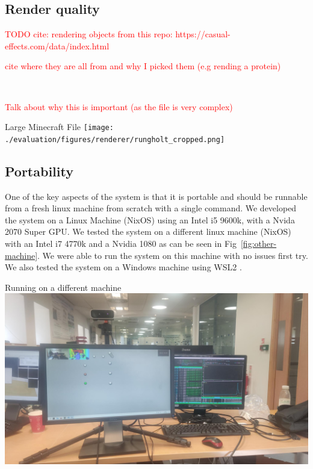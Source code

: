 \subsection[short]{Render quality}
\textcolor{red}{TODO cite: rendering objects from this repo: https://casual-effects.com/data/index.html}


\textcolor{red}{cite where they are all from and why I picked them (e.g rending a protein)}

\begin{invisBox}  
	\hfill
	\\[0.3cm]
	\hfill
\end{invisBox}

\textcolor{red}{Talk about why this is important (as the file is very complex)}

\begin{figureBox}[label={fig:rungholt}, width=1.0\linewidth]{Large Minecraft File}
	\texttt{[image: ./evaluation/figures/renderer/rungholt\_cropped.png]}
\end{figureBox}


\subsection{Portability}
One of the key aspects of the system is that it is portable and should be runnable from a fresh linux machine from scratch with a single command. We developed the system on a Linux Machine (NixOS) using an Intel i5 9600k, with a Nvida 2070 Super GPU. We tested the system on a different linux machine (NixOS) with an Intel i7 4770k and a Nvidia 1080 as can be seen in Fig~\ref{fig:other-machine}. We were able to run the system on this machine with no issues first try. We also tested the system on a Windows machine using WSL2 \todo. 

\begin{figureBox}[label={fig:other-machine}, width=0.7\linewidth]{Running on a different machine}
	\includegraphics[width = 1.0\linewidth]{./evaluation/figures/other-device.jpeg}
\end{figureBox}